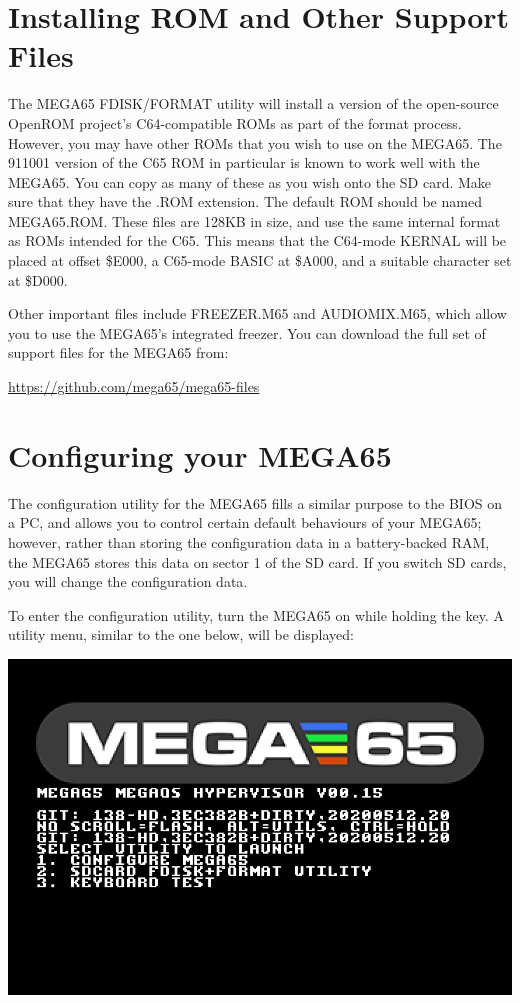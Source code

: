\section{Installing ROM and Other Support Files}

The MEGA65 FDISK/FORMAT utility will install a version of the open-source OpenROM project's C64-compatible ROMs as part of the format process. However, you may have other ROMs that you wish to use on the MEGA65. The 911001 version of the C65 ROM in particular is known to work well with the MEGA65. You can copy as many of these as you wish onto the SD card. Make sure that they have the .ROM extension. The default ROM should be named MEGA65.ROM. These files
are 128KB in size, and use the same internal format as ROMs intended for the C65. This means that the C64-mode KERNAL will be placed at offset \$E000, a C65-mode BASIC at \$A000, and a suitable character set at \$D000.

Other important files include FREEZER.M65 and AUDIOMIX.M65, which allow you to use the MEGA65's integrated freezer. You can download the full set of support files for the MEGA65 from:

\url{https://github.com/mega65/mega65-files}

\section{Configuring your MEGA65}

The configuration utility for the MEGA65 fills a similar purpose to the BIOS on a PC, and allows you to control certain default behaviours of your MEGA65; however, rather than storing the configuration data in a
battery-backed RAM, the MEGA65 stores this data on sector 1 of the SD card. If you switch SD cards, you will change the configuration data.

To enter the configuration utility, turn the MEGA65 on while holding the  key. A utility menu, similar to the one below, will be displayed:

\includegraphics[width=\linewidth]{images/ss-utilmenu.png}

